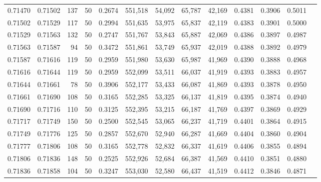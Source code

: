\begin{tabular}{rrrrrrrrrrrrr}
0.71470 & 0.71502 &   137 &  50 &                                     0.2674 & 551,518 &  54,092 &  65,787 &  42,169 & 0.4381 & 0.3906 & 0.5011 \\
0.71502 & 0.71529 &   117 &  50 &                                     0.2994 & 551,635 &  53,975 &  65,837 &  42,119 & 0.4383 & 0.3901 & 0.5000 \\
0.71529 & 0.71563 &   132 &  50 &                                     0.2747 & 551,767 &  53,843 &  65,887 &  42,069 & 0.4386 & 0.3897 & 0.4987 \\
0.71563 & 0.71587 &    94 &  50 &                                     0.3472 & 551,861 &  53,749 &  65,937 &  42,019 & 0.4388 & 0.3892 & 0.4979 \\
0.71587 & 0.71616 &   119 &  50 &                                     0.2959 & 551,980 &  53,630 &  65,987 &  41,969 & 0.4390 & 0.3888 & 0.4968 \\
0.71616 & 0.71644 &   119 &  50 &                                     0.2959 & 552,099 &  53,511 &  66,037 &  41,919 & 0.4393 & 0.3883 & 0.4957 \\
0.71644 & 0.71661 &    78 &  50 &                                     0.3906 & 552,177 &  53,433 &  66,087 &  41,869 & 0.4393 & 0.3878 & 0.4950 \\
0.71661 & 0.71690 &   108 &  50 &                                     0.3165 & 552,285 &  53,325 &  66,137 &  41,819 & 0.4395 & 0.3874 & 0.4940 \\
0.71690 & 0.71716 &   110 &  50 &                                     0.3125 & 552,395 &  53,215 &  66,187 &  41,769 & 0.4397 & 0.3869 & 0.4929 \\
0.71717 & 0.71749 &   150 &  50 &                                     0.2500 & 552,545 &  53,065 &  66,237 &  41,719 & 0.4401 & 0.3864 & 0.4915 \\
0.71749 & 0.71776 &   125 &  50 &                                     0.2857 & 552,670 &  52,940 &  66,287 &  41,669 & 0.4404 & 0.3860 & 0.4904 \\
0.71777 & 0.71806 &   108 &  50 &                                     0.3165 & 552,778 &  52,832 &  66,337 &  41,619 & 0.4406 & 0.3855 & 0.4894 \\
0.71806 & 0.71836 &   148 &  50 &                                     0.2525 & 552,926 &  52,684 &  66,387 &  41,569 & 0.4410 & 0.3851 & 0.4880 \\
0.71836 & 0.71858 &   104 &  50 &                                     0.3247 & 553,030 &  52,580 &  66,437 &  41,519 & 0.4412 & 0.3846 & 0.4871 \\

\end{tabular}
